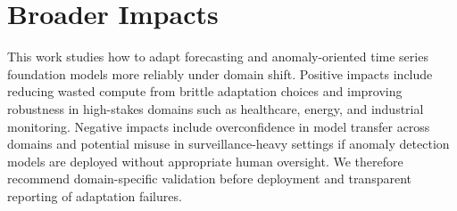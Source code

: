 \section{Broader Impacts}
\label{sec:broader}
This work studies how to adapt forecasting and anomaly-oriented time series foundation models more reliably under domain shift. Positive impacts include reducing wasted compute from brittle adaptation choices and improving robustness in high-stakes domains such as healthcare, energy, and industrial monitoring. Negative impacts include overconfidence in model transfer across domains and potential misuse in surveillance-heavy settings if anomaly detection models are deployed without appropriate human oversight. We therefore recommend domain-specific validation before deployment and transparent reporting of adaptation failures.
